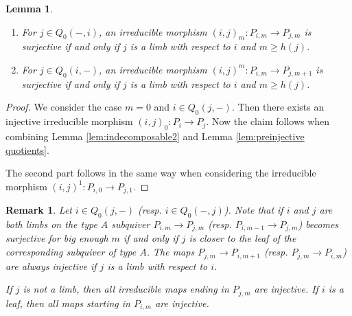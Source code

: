 \documentclass{amsart}
\newtheorem{lemma}[theorem]{Lemma}
\newtheorem{remark}[theorem]{Remark}
\numberwithin{equation}{section}
\begin{document}
\begin{lemma}
  \label{lem:irreducible morphisms}
  \mbox{}
  \begin{enumerate}
    \item For $j\in Q_0(-,i)$, an irreducible morphism $(i,j)_m:P_{i,m}\to P_{j,m}$ is surjective if and only if $j$ is a limb with respect to $i$ and $m\geq h(j)$. 
    \item For $j\in Q_0(i,-)$, an irreducible morphism $(i,j)^m:P_{i,m}\to P_{j,m+1}$ is surjective if and only if $j$ is a limb with respect to $i$ and $m\geq h(j)$.
  \end{enumerate}
\end{lemma}
\begin{proof}

We consider the case $m=0$ and $i\in Q_0(j,-)$. Then there exists an injective irreducible morphism $(i,j)_0:P_{i}\to P_j$.  Now the claim follows when combining Lemma \ref{lem:indecomposable2} and Lemma \ref{lem:preinjective quotients}.




The second part follows in the same way when considering the irreducible morphism $(i,j)^1:P_{i,0}\to P_{j,1}$.

\end{proof}

\begin{remark}
  Let $i\in Q_0(j,-)$ (resp. $i\in Q_0(-,j)$).
  Note that if $i$ and $j$ are both limbs on the type $A$ subquiver $P_{i,m}\to P_{j,m}$ (resp. $P_{i,m-1}\to P_{j,m}$) becomes surjective for big enough $m$ if and only if $j$ is closer to the leaf of the corresponding subquiver of type $A$.
  The maps $P_{j,m}\to P_{i,m+1}$ (resp. $P_{j,m}\to P_{i,m}$) are always injective if $j$ is a limb with respect to $i$.

If $j$ is not a limb, then all irreducible maps ending in $P_{j,m}$ are injective. If $i$ is a leaf, then all maps starting in $P_{i,m}$ are injective.
\end{remark}
\end{document}
